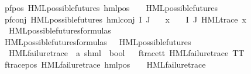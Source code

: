 \begin{isabellebody}
pf{\isacharunderscore}{\kern0pt}pos{\isacharcolon}{\kern0pt}\ {\isachardoublequoteopen}HML{\isacharunderscore}{\kern0pt}possible{\isacharunderscore}{\kern0pt}futures\ {\isacharparenleft}{\kern0pt}hml{\isacharunderscore}{\kern0pt}pos\ {\isasymalpha}\ {\isasymphi}{\isacharparenright}{\kern0pt}{\isachardoublequoteclose}\ \ {\isachardoublequoteopen}HML{\isacharunderscore}{\kern0pt}possible{\isacharunderscore}{\kern0pt}futures\ {\isasymphi}{\isachardoublequoteclose}\ {\isacharbar}{\kern0pt}\isanewline
pf{\isacharunderscore}{\kern0pt}conj{\isacharcolon}{\kern0pt}\ {\isachardoublequoteopen}HML{\isacharunderscore}{\kern0pt}possible{\isacharunderscore}{\kern0pt}futures\ {\isacharparenleft}{\kern0pt}hml{\isacharunderscore}{\kern0pt}conj\ I\ J\ {\isasymPhi}{\isacharparenright}{\kern0pt}{\isachardoublequoteclose}\ \isanewline
{}\ {\isachardoublequoteopen}{\isasymforall}x\ {\isasymin}\ {\isacharparenleft}{\kern0pt}{\isasymPhi}\ {\isacharbackquote}{\kern0pt}\ {\isacharparenleft}{\kern0pt}I{\isasymunion}\ J{\isacharparenright}{\kern0pt}{\isacharparenright}{\kern0pt}{\isachardot}{\kern0pt}\ {\isacharparenleft}{\kern0pt}HML{\isacharunderscore}{\kern0pt}trace\ x{\isacharparenright}{\kern0pt}{\isachardoublequoteclose}\isanewline
\isanewline
{}\isamarkupfalse%
\ HML{\isacharunderscore}{\kern0pt}possible{\isacharunderscore}{\kern0pt}futures{\isacharunderscore}{\kern0pt}formulas\ \isanewline
{\isachardoublequoteopen}HML{\isacharunderscore}{\kern0pt}possible{\isacharunderscore}{\kern0pt}futures{\isacharunderscore}{\kern0pt}formulas\ {\isasymequiv}\ {\isacharbraceleft}{\kern0pt}{\isasymphi}{\isachardot}{\kern0pt}\ HML{\isacharunderscore}{\kern0pt}possible{\isacharunderscore}{\kern0pt}futures\ {\isasymphi}{\isacharbraceright}{\kern0pt}{\isachardoublequoteclose}\isanewline
\isanewline
{}\isamarkupfalse%
\ HML{\isacharunderscore}{\kern0pt}failure{\isacharunderscore}{\kern0pt}trace\ {\isacharcolon}{\kern0pt}{\isacharcolon}{\kern0pt}\ {\isachardoublequoteopen}{\isacharparenleft}{\kern0pt}{\isacharprime}{\kern0pt}a{\isacharcomma}{\kern0pt}\ {\isacharprime}{\kern0pt}s{\isacharparenright}{\kern0pt}hml\ {\isasymRightarrow}\ bool{\isachardoublequoteclose}\isanewline
\ \ \isanewline
f{\isacharunderscore}{\kern0pt}trace{\isacharunderscore}{\kern0pt}tt{\isacharcolon}{\kern0pt}\ {\isachardoublequoteopen}HML{\isacharunderscore}{\kern0pt}failure{\isacharunderscore}{\kern0pt}trace\ TT{\isachardoublequoteclose}\ {\isacharbar}{\kern0pt}\isanewline
f{\isacharunderscore}{\kern0pt}trace{\isacharunderscore}{\kern0pt}pos{\isacharcolon}{\kern0pt}\ {\isachardoublequoteopen}HML{\isacharunderscore}{\kern0pt}failure{\isacharunderscore}{\kern0pt}trace\ {\isacharparenleft}{\kern0pt}hml{\isacharunderscore}{\kern0pt}pos\ {\isasymalpha}\ {\isasymphi}{\isacharparenright}{\kern0pt}{\isachardoublequoteclose}\ \ {\isachardoublequoteopen}HML{\isacharunderscore}{\kern0pt}failure{\isacharunderscore}{\kern0pt}trace\ {\isasymphi}{\isachardoublequoteclose}{\isacharbar}{\kern0pt}\isanewline

\end{isabellebody}
